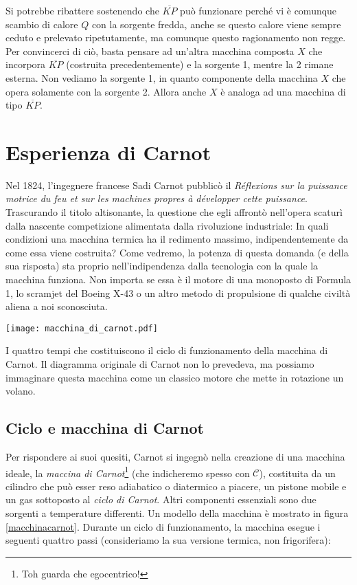 Si potrebbe ribattere sostenendo che $\overline{KP}$ può funzionare
perché vi è comunque scambio di calore $Q$ con la sorgente fredda,
anche se questo calore viene sempre ceduto e prelevato ripetutamente,
ma comunque questo ragionamento non regge. Per convincerci di ciò,
basta pensare ad un'altra macchina composta $X$ che incorpora
$\overline{KP}$ (costruita precedentemente) e la sorgente 1, mentre la 2
rimane esterna. Non vediamo la sorgente 1, in quanto componente
della macchina $X$ che opera solamente con la sorgente 2. Allora anche $X$
è analoga ad una macchina di tipo $\overline{KP}$.


\section{Esperienza di Carnot}
Nel 1824, l'ingegnere francese Sadi Carnot pubblicò il
\textit{Réflexions sur la puissance motrice du feu et sur les machines
propres à développer cette puissance}. Trascurando il titolo
altisonante, la questione che egli affrontò nell'opera
scaturì dalla nascente competizione alimentata dalla rivoluzione industriale:
In quali condizioni una macchina termica ha il redimento
massimo, indipendentemente da come essa viene costruita? Come
vedremo, la potenza di questa domanda (e della sua risposta) sta
proprio nell'indipendenza dalla tecnologia con la quale la
macchina funziona. Non importa se essa è il motore di una monoposto
di Formula 1, lo scramjet del Boeing X-43 o un altro metodo di
propulsione di qualche civiltà aliena a noi sconosciuta.

\begin{marginfigure}
    \centering
    \texttt{[image: macchina\_di\_carnot.pdf]}
    \caption{I quattro tempi che costituiscono il ciclo di funzionamento della macchina di Carnot.
    Il diagramma originale di Carnot non lo prevedeva, ma possiamo immaginare questa macchina come
    un classico motore che mette in rotazione un volano.}
    \label{macchinacarnot}
\end{marginfigure}

\subsection{Ciclo e macchina di Carnot}
Per rispondere ai suoi quesiti,
Carnot si ingegnò nella creazione di una macchina ideale,
la \textit{maccina di Carnot}\footnote{Toh guarda che egocentrico!} (che indicheremo spesso con $\mathcal{C}$),
costituita da un cilindro che può esser reso adiabatico o
diatermico a piacere, un pistone mobile e un gas sottoposto al
\textit{ciclo di Carnot}. Altri componenti essenziali sono due
sorgenti a temperature differenti.
Un modello della macchina è mostrato in figura \ref{macchinacarnot}.
Durante un ciclo
di funzionamento, la macchina esegue i seguenti quattro passi
(consideriamo la sua versione termica, non frigorifera):


